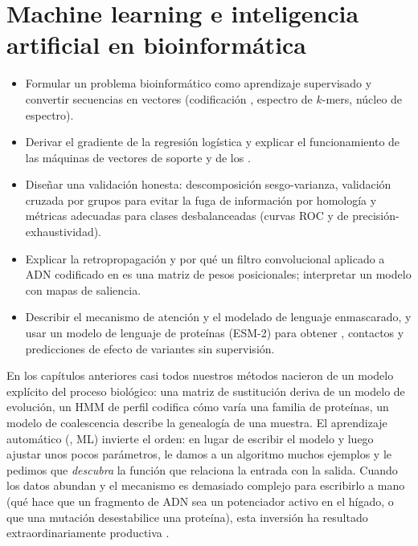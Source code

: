 \chapter{Machine learning e \mbox{inteligencia} artificial en \mbox{bioinformática}}\label{cap:17}



\begin{objetivos}
\begin{itemize}
  \item Formular un problema bioinformático como aprendizaje supervisado y convertir secuencias en vectores (codificación , espectro de $k$-mers, núcleo de espectro).
  \item Derivar el gradiente de la regresión logística y explicar el funcionamiento de las máquinas de vectores de soporte y de los .
  \item Diseñar una validación honesta: descomposición sesgo-varianza, validación cruzada por grupos para evitar la fuga de información por homología y métricas adecuadas para clases desbalanceadas (curvas ROC y de precisión-exhaustividad).
  \item Explicar la retropropagación y por qué un filtro convolucional aplicado a ADN codificado en  es una matriz de pesos posicionales; interpretar un modelo con mapas de saliencia.
  \item Describir el mecanismo de atención y el modelado de lenguaje enmascarado, y usar un modelo de lenguaje de proteínas (ESM-2) para obtener , contactos y predicciones de efecto de variantes sin supervisión.
\end{itemize}
\end{objetivos}

En los capítulos anteriores casi todos nuestros métodos nacieron de un modelo explícito del proceso biológico: una matriz de sustitución deriva de un modelo de evolución, un HMM de perfil codifica cómo varía una familia de proteínas, un modelo de coalescencia describe la genealogía de una muestra. El aprendizaje automático (, ML) invierte el orden: en lugar de escribir el modelo y luego ajustar unos pocos parámetros, le damos a un algoritmo muchos ejemplos y le pedimos que \emph{descubra} la función que relaciona la entrada con la salida. Cuando los datos abundan y el mecanismo es demasiado complejo para escribirlo a mano (qué hace que un fragmento de ADN sea un potenciador activo en el hígado, o que una mutación desestabilice una proteína), esta inversión ha resultado extraordinariamente productiva \parencite{c17-lecun2015,c17-greener2022}.

